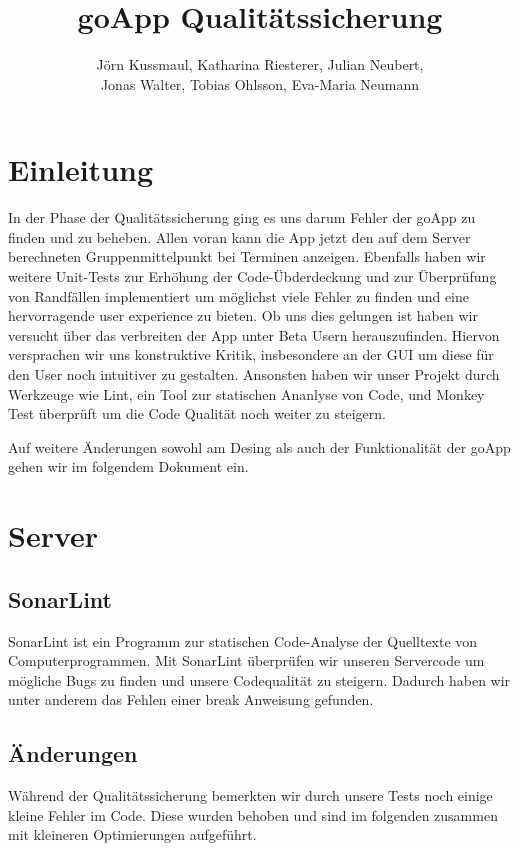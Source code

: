 \documentclass{scrartcl}
\title{goApp Qualitätssicherung}
\author{Jörn Kussmaul, Katharina Riesterer, Julian Neubert,\\ Jonas Walter, Tobias Ohlsson, Eva-Maria Neumann}
\begin{document}
	\maketitle
	\newpage
	\tableofcontents
	\newpage

\section{Einleitung}
In der Phase der Qualitätssicherung ging es uns darum Fehler der goApp zu finden und zu beheben.
Allen voran kann die App jetzt den auf dem Server berechneten Gruppenmittelpunkt bei Terminen anzeigen.
\newline
Ebenfalls haben wir weitere Unit-Tests zur Erhöhung der Code-Übderdeckung und zur Überprüfung von Randfällen implementiert um möglichst viele Fehler zu finden und eine hervorragende user experience zu bieten.
\newline
Ob uns dies gelungen ist haben wir versucht über das verbreiten der App unter Beta Usern herauszufinden.
Hiervon versprachen wir uns konstruktive Kritik, insbesondere an der GUI um diese für den User noch intuitiver zu gestalten. 
Ansonsten haben wir unser Projekt durch Werkzeuge wie Lint, ein Tool zur statischen Ananlyse von Code, und Monkey Test überprüft um die Code Qualität noch weiter zu steigern.

Auf weitere Änderungen sowohl am Desing als auch der Funktionalität der goApp gehen wir im folgendem Dokument ein.

\newpage
\section{Server}
\subsection{SonarLint}
SonarLint ist ein Programm zur statischen Code-Analyse der Quelltexte von Computerprogrammen. Mit SonarLint überprüfen wir unseren Servercode um mögliche Bugs zu finden und unsere Codequalität zu steigern.
Dadurch haben wir unter anderem das Fehlen einer break Anweisung gefunden.

\subsection{Änderungen}
Während der Qualitätssicherung bemerkten wir durch unsere Tests noch einige kleine Fehler im Code. Diese wurden behoben und sind im folgenden zusammen mit kleineren Optimierungen aufgeführt.
\end{document}
